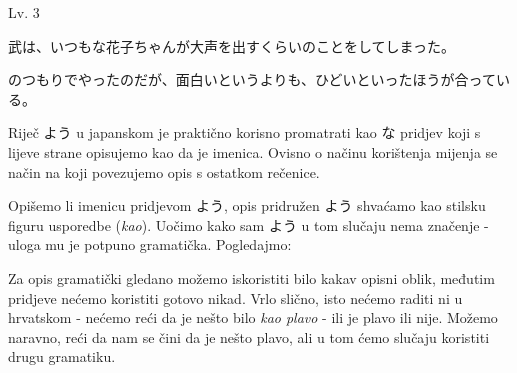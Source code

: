 	\begin{mondai}{Lv. 3}
		\item 武は、いつもな花子ちゃんが大声を出すくらいのことをしてしまった。
		\item *のつもりでやったのだが、面白いというよりも、ひどいといったほうが合っている。
	\end{mondai}
\newpage
{}

	
	
	
	Riječ よう u japanskom je praktično korisno promatrati kao な pridjev koji s lijeve strane opisujemo kao da je imenica. Ovisno o načinu korištenja mijenja se način na koji povezujemo opis s ostatkom rečenice.
	
	
	Opišemo li imenicu pridjevom よう, opis pridružen よう shvaćamo kao stilsku figuru usporedbe (\textit{kao}). Uočimo kako sam よう u tom slučaju nema značenje - uloga mu je potpuno gramatička. Pogledajmo:
	
	\begin{reibun}
	\end{reibun}

	Za opis gramatički gledano možemo iskoristiti bilo kakav opisni oblik, međutim pridjeve nećemo koristiti gotovo nikad. Vrlo slično, isto nećemo raditi ni u hrvatskom - nećemo reći da je nešto bilo \textit{kao plavo} - ili je plavo ili nije. Možemo naravno, reći da nam se čini da je nešto plavo, ali u tom ćemo slučaju koristiti drugu gramatiku\footnotemark[2].
	
	
